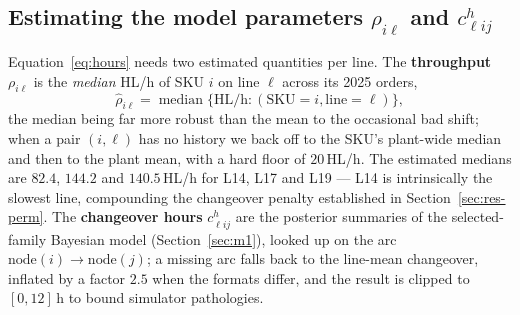 \documentclass[11pt,a4paper]{article}
\begin{document}
\subsection{Estimating the model parameters $\rho_{i\ell}$ and $c^h_{\ell ij}$}\label{sec:params}
Equation~\eqref{eq:hours} needs two estimated quantities per line. The
\textbf{throughput} $\rho_{i\ell}$ is the \emph{median} HL/h of SKU $i$ on line
$\ell$ across its 2025 orders,
\begin{equation}
\hat\rho_{i\ell}=\operatorname{median}\{\text{HL/h}:(\text{SKU}=i,\text{line}=\ell)\},
\end{equation}
the median being far more robust than the mean to the occasional bad shift; when a
pair $(i,\ell)$ has no history we back off to the SKU's plant-wide median and then
to the plant mean, with a hard floor of $20$\,HL/h. The estimated medians are
$82.4$, $144.2$ and $140.5$\,HL/h for L14, L17 and L19 --- L14 is intrinsically the
slowest line, compounding the changeover penalty established in
Section~\ref{sec:res-perm}. The \textbf{changeover hours} $c^h_{\ell ij}$ are the
posterior summaries of the selected-family Bayesian model (Section~\ref{sec:m1}), looked up
on the arc $\text{node}(i)\!\to\!\text{node}(j)$; a missing arc falls back to the
line-mean changeover, inflated by a factor $2.5$ when the formats differ, and the
result is clipped to $[0,12]$\,h to bound simulator pathologies.
\end{document}
